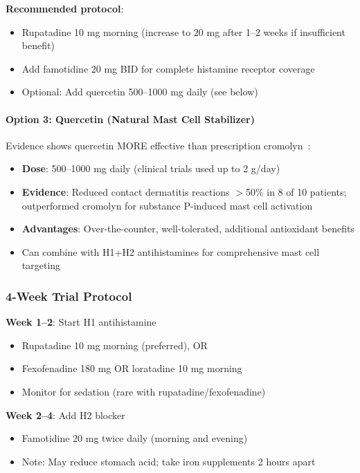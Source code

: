 \textbf{Recommended protocol}:
\begin{itemize}
    \item Rupatadine 10 mg morning (increase to 20 mg after 1--2 weeks if insufficient benefit)
    \item Add famotidine 20 mg BID for complete histamine receptor coverage
    \item Optional: Add quercetin 500--1000 mg daily (see below)
\end{itemize}

\paragraph{Option 3: Quercetin (Natural Mast Cell Stabilizer)}
Evidence shows quercetin MORE effective than prescription cromolyn~\cite{Theoharides2012}:
\begin{itemize}
    \item \textbf{Dose}: 500--1000 mg daily (clinical trials used up to 2 g/day)
    \item \textbf{Evidence}: Reduced contact dermatitis reactions $>$50\% in 8 of 10 patients; outperformed cromolyn for substance P-induced mast cell activation~\cite{Theoharides2012}
    \item \textbf{Advantages}: Over-the-counter, well-tolerated, additional antioxidant benefits
    \item Can combine with H1+H2 antihistamines for comprehensive mast cell targeting
\end{itemize}

\subsubsection{4-Week Trial Protocol}

\textbf{Week 1--2}: Start H1 antihistamine
\begin{itemize}
    \item Rupatadine 10 mg morning (preferred), OR
    \item Fexofenadine 180 mg OR loratadine 10 mg morning
    \item Monitor for sedation (rare with rupatadine/fexofenadine)
\end{itemize}

\textbf{Week 2--4}: Add H2 blocker
\begin{itemize}
    \item Famotidine 20 mg twice daily (morning and evening)
    \item Note: May reduce stomach acid; take iron supplements 2 hours apart
\end{itemize}

